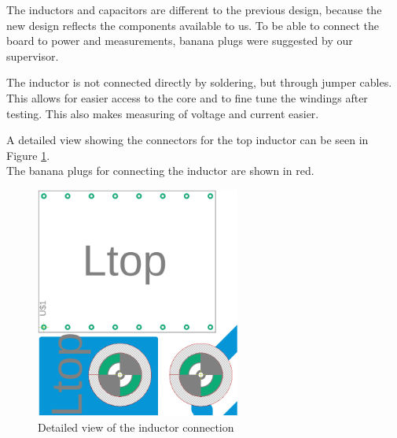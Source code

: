 The inductors and capacitors are different to the previous design,
because the new design reflects the components available to us.
To be able to connect the board to power and measurements,
banana plugs were suggested by our supervisor.

The inductor is not connected directly by soldering,
but through jumper cables.
This allows for easier access to the core and to fine tune the windings after testing.
This also makes measuring of voltage and current easier.

A detailed view showing the connectors for the top inductor can be seen in Figure \ref{fig:multi2nxDetail}.\\
The banana plugs for connecting the inductor are shown in red.

\begin{figure}[H]
	\begin{center}
	\includegraphics[width=0.6\textwidth]{"figures/05cPCBdesign/DETAiL_3level_2NX_interleaved_boost_converter"}
	\end{center}
	\caption{Detailed view of the inductor connection}
	\label{fig:multi2nxDetail}
\end{figure}
